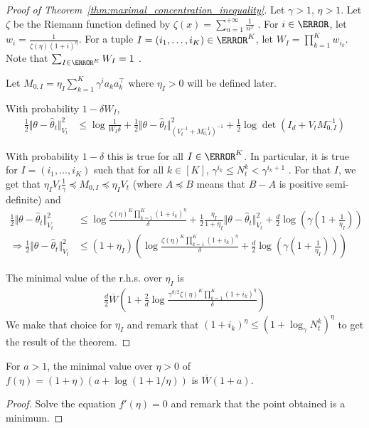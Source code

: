 \begin{proof}[Proof of Theorem~\ref{thm:maximal_concentration_inequality}]
Let $\gamma > 1$, $\eta > 1$. Let $\zeta$ be the Riemann function defined by $\zeta(x) = \sum_{n=1}^{+\infty}\frac{1}{n^x}$ . For $i\in \N$, let $w_i = \frac{1}{\zeta(\eta)(1+i)^\eta}$. For a tuple $I=(i_1,\ldots,i_K)\in \N^K$, let $W_I = \prod_{k=1}^K w_{i_k}$. Note that $\sum_{I \in \N^K} W_I = 1$ .

Let $M_{0,I} = \eta_I \sum_{k=1}^K \gamma^i a_k a_k^\top$ where $\eta_I > 0$ will be defined later.

With probability $1- \delta W_I$,
\begin{align*}
\frac{1}{2} \Vert \theta - \hat{\theta}_t \Vert^2_{V_t}
&\le \log\frac{1}{W_I \delta} + \frac{1}{2} \Vert \theta - \hat{\theta}_t \Vert_{(V_t^{-1} + M_{0,I}^{-1})^{-1}}^2 + \frac{1}{2} \log \det (I_d + V_t M_{0,I}^{-1})
\end{align*}

With probability $1- \delta$ this is true for all $I \in \N^K$. In particular, it is true for $I=(i_1,\ldots,i_K)$ such that for all $k \in [K]$, $\gamma^{i_k} \le N_t^k < \gamma^{i_k+1}$ . For that $I$, we get that $\eta_I V_t \frac{1}{\gamma} \preceq M_{0,I} \preceq \eta_I V_t$ (where $A\preceq B$ means that $B-A$ is positive semi-definite) and
\begin{align*}
\frac{1}{2} \Vert \theta - \hat{\theta}_t \Vert^2_{V_t}
&\le \log\frac{\zeta(\eta)^K\prod_{k=1}^K(1+i_k)^\eta}{\delta} + \frac{1}{2} \frac{\eta_I}{1+\eta_I} \Vert \theta - \hat{\theta}_t \Vert_{V_t}^2 + \frac{d}{2} \log (\gamma(1 + \frac{1}{\eta_I}))
\\
\Rightarrow
\frac{1}{2} \Vert \theta - \hat{\theta}_t \Vert^2_{V_t}
&\le (1 + \eta_I)\left(\log\frac{\zeta(\eta)^K\prod_{k=1}^K(1+i_k)^\eta}{\delta} + \frac{d}{2} \log (\gamma(1 + \frac{1}{\eta_I})) \right)
\end{align*}

The minimal value of the r.h.s. over $\eta_I$ is
\begin{align*}
\frac{d}{2} \overline{W}\left( 1 + \frac{2}{d}\log \frac{\gamma^{d/2}\zeta(\eta)^K\prod_{k=1}^K(1+i_k)^\eta}{\delta} \right)
\end{align*}
We make that choice for $\eta_I$ and remark that $(1+i_k)^\eta \le (1+\log_\gamma N_t^k)^\eta$ to get the result of the theorem.


\end{proof}

\begin{lemma}
For $a>1$, the minimal value over $\eta>0$ of $f(\eta) = (1+\eta)(a+\log(1+1/\eta))$ is $\overline{W}(1+a)$.
\end{lemma}
\begin{proof}
Solve the equation $f'(\eta)=0$ and remark that the point obtained is a minimum.
\end{proof}

\fi

